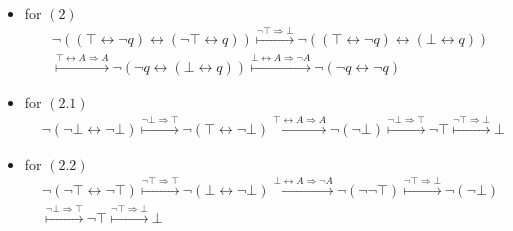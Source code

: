 \documentclass[11pt,a4paper]{article}
\begin{document}
\begin{itemize}
\item for $(2)$
\begin{equation*}
\begin{split}
&\neg( (\top \leftrightarrow \neg q) \leftrightarrow (\neg \top \leftrightarrow q)) \stackrel{\neg \top \Rightarrow\bot}{\longmapsto} 
\neg( (\top \leftrightarrow \neg q) \leftrightarrow (\bot \leftrightarrow q)) \\
&\stackrel{\top \leftrightarrow A \Rightarrow A}{\longmapsto} 
\neg(  \neg q \leftrightarrow (\bot \leftrightarrow q)) \stackrel{\bot \leftrightarrow A \Rightarrow \neg A}{\longmapsto} 
\neg(  \neg q \leftrightarrow \neg q) 
\end{split}
\end{equation*}
\item for $(2.1)$
\begin{equation*}
\begin{split}
& \neg(  \neg \bot \leftrightarrow \neg \bot)  \stackrel{\neg \bot \Rightarrow \top}{\longmapsto} 
\neg( \top \leftrightarrow \neg \bot)  \stackrel{\top \leftrightarrow A  \Rightarrow A}{\longmapsto}
\neg( \neg \bot)  \stackrel{\neg \bot \Rightarrow \top}{\longmapsto} 
\neg \top \stackrel{\neg \top \Rightarrow \bot}{\longmapsto} 
 \bot
\end{split}
\end{equation*}

\item for $(2.2)$
\begin{equation*}
\begin{split}
& \neg(  \neg \top \leftrightarrow \neg \top)  \stackrel{\neg \top \Rightarrow \top}{\longmapsto} 
\neg( \bot \leftrightarrow \neg \bot)  \stackrel{\bot \leftrightarrow A  \Rightarrow \neg A}{\longmapsto}
\neg( \neg \neg \top)  \stackrel{\neg \top \Rightarrow \bot}{\longmapsto} 
\neg( \neg\bot) \\
& \stackrel{\neg \bot \Rightarrow \top}{\longmapsto} 
\neg \top \stackrel{\neg \top \Rightarrow \bot}{\longmapsto} 
 \bot
\end{split}
\end{equation*}
\end{itemize}
\end{document}
